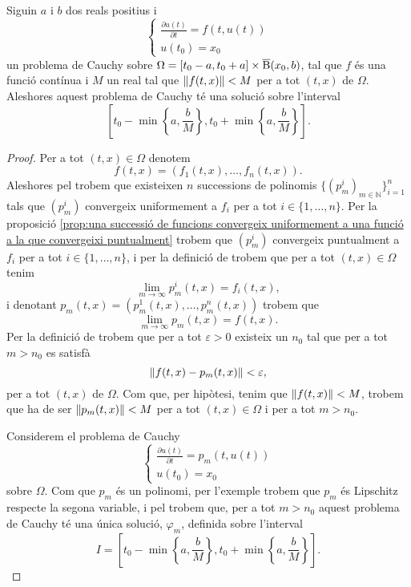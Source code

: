 \documentclass[../Apunts.tex]{subfiles}
\begin{document}
	\begin{theorem}
		\label{thm:Teorema de Peano}
		Siguin \(a\) i \(b\) dos reals positius i
		\begin{equation}
			\label{thm:Teorema de Peano:eq3}
			\begin{cases}
				\displaystyle\frac{\partial u(t)}{\partial t}=f(t,u(t)) \\
				\displaystyle u(t_{0})=x_{0}
			\end{cases}
		\end{equation}
		un problema de Cauchy sobre \(\Omega=[t_{0}-a,t_{0}+a]\times\overline{\operatorname{B}}(x_{0},b)\), tal que \(f\) és una funció contínua i \(M\) un real tal que \(\norm{f(t,x)}<M\) per a tot \((t,x)\) de \(\Omega\).
		Aleshores aquest problema de Cauchy té una solució sobre l'interval
		\[\left[t_{0}-\min\left\{a,\frac{b}{M}\right\},t_{0}+\min\left\{a,\frac{b}{M}\right\}\right].\]
		\begin{proof} %
			Per a tot \((t,x)\in\Omega\) denotem
			\[f(t,x)=(f_{1}(t,x),\dots,f_{n}(t,x)).\]
			Aleshores pel  trobem que existeixen \(n\) successions de polinomis \(\{(p_{m}^{i})_{m\in\mathbb{N}}\}_{i=1}^{n}\) tals que \((p_{m}^{i})\) convergeix uniformement a \(f_{i}\) per a tot \(i\in\{1,\dots,n\}\). Per la proposició \ref{prop:una successió de funcions convergeix uniformement a una funció a la que convergeixi puntualment} trobem que \((p_{m}^{i})\) convergeix puntualment a \(f_{i}\) per a tot \(i\in\{1,\dots,n\}\), i per la definició de  trobem que per a tot \((t,x)\in\Omega\) tenim
			\[\lim_{m\to\infty}p_{m}^{i}(t,x)=f_{i}(t,x),\]
			i denotant \(p_{m}(t,x)=(p_{m}^{1}(t,x),\dots,p_{m}^{n}(t,x))\) trobem que
			\begin{equation}
				\label{thm:Teorema de Peano:eq2}
				\lim_{m\to\infty}p_{m}(t,x)=f(t,x).
			\end{equation}
			Per la definició de  trobem que per a tot \(\varepsilon>0\) existeix un \(n_{0}\) tal que per a tot \(m>n_{0}\) es satisfà
			\[\norm{f(t,x)-p_{m}(t,x)}<\varepsilon,\]
			per a tot \((t,x)\) de \(\Omega\). Com que, per hipòtesi, tenim que \(\norm{f(t,x)}<M\), trobem que ha de ser \(\norm{p_{m}(t,x)}<M\) per a tot \((t,x)\in\Omega\) i per a tot \(m>n_{0}\).
			
			Considerem el problema de Cauchy
			\[\begin{cases}
				\displaystyle\frac{\partial u(t)}{\partial t}=p_{m}(t,u(t)) \\
				\displaystyle u(t_{0})=x_{0}
			\end{cases}\] %
			sobre \(\Omega\). Com que \(p_{m}\) és un polinomi, per l'exemple  trobem que \(p_{m}\) és Lipschitz respecte la segona variable, i pel  trobem que, per a tot \(m>n_{0}\) aquest problema de Cauchy té una única solució, \(\varphi_{m}\), definida sobre l'interval
			\[I=\left[t_{0}-\min\left\{a,\frac{b}{M}\right\},t_{0}+\min\left\{a,\frac{b}{M}\right\}\right].\]
			

\end{proof}
\end{theorem}
\end{document}
